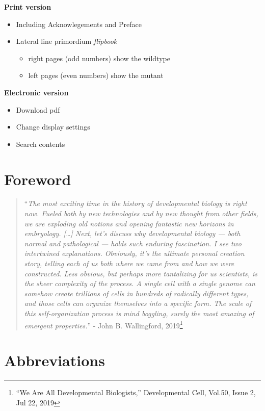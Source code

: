 \documentclass[10pt, b5paper, singlespacinge, twoside]{reedthesis} %
\providecommand{\tightlist}{%
  \setlength{\itemsep}{0pt}\setlength{\parskip}{0pt}}
\theoremstyle{definition}
\theoremstyle{definition}
\theoremstyle{definition}
\theoremstyle{remark}
\begin{document}
\noindent \textbf{Print version}
\begin{itemize}
\tightlist
\item
  Including Acknowlegements and Preface
\item
  Lateral line primordium \emph{flipbook}
  \begin{itemize}
  \tightlist
  \item
    right pages (odd numbers) show the wildtype
  \item
    left pages (even numbers) show the mutant
  \end{itemize}
\end{itemize}
\noindent \textbf{Electronic version}
\begin{itemize}
\tightlist
\item
  Download pdf
\item
  Change display settings
\item
  Search contents
\end{itemize}
\newpage

\hypertarget{foreword}{%
\section*{Foreword}\label{foreword}}

\vspace{1cm}
\begin{quote}
``\emph{The most exciting time in the history of developmental biology is right now. Fueled both by new technologies and by new thought from other fields, we are exploding old notions and opening fantastic new horizons in embryology. {[}\ldots{]}
Next, let's discuss why developmental biology --- both normal and pathological --- holds such enduring fascination. I see two intertwined explanations. Obviously, it's the ultimate personal creation story, telling each of us both where we came from and how we were constructed. Less obvious, but perhaps more tantalizing for us scientists, is the sheer complexity of the process. A single cell with a single genome can somehow create trillions of cells in hundreds of radically different types, and those cells can organize themselves into a specific form. The scale of this self-organization process is mind boggling, surely the most amazing of emergent properties.}''
- John B. Wallingford, 2019\footnote{``We Are All Developmental Biologists,'' Developmental Cell, Vol.50, Issue 2, Jul 22, 2019}
\end{quote}
\hypertarget{abbreviations}{%
\section*{Abbreviations}\label{abbreviations}}
\end{document}
